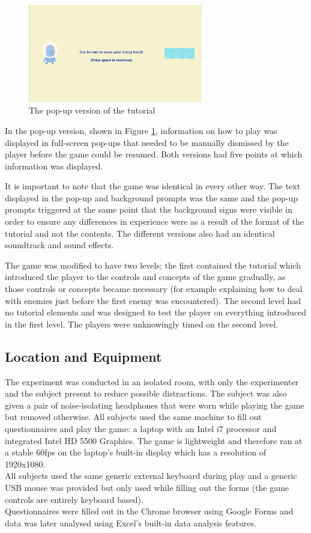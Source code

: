 \documentclass{acmsiggraph}
\begin{document}
\begin{figure}[!h]
  \centering
  \includegraphics[width=3.0in]{images/odd}
  \caption{The pop-up version of the tutorial}
  \label{fig:odd}
\end{figure}
In the pop-up version, shown in Figure \ref{fig:odd}, information on how to play was displayed in full-screen pop-ups that needed to be manually dismissed by the player before the game could be resumed. Both versions had five points at which information was displayed. 

It is important to note that the game was identical in every other way. The text displayed in the pop-up and background prompts was the same and the pop-up prompts triggered at the same point that the background signs were visible in order to ensure any differences in experience were as a result of the format of the tutorial and not the contents. The different versions also had an identical soundtrack and sound effects.

The game was modified to have two levels; the first contained the tutorial which introduced the player to the controls and concepts of the game gradually, as those controls or concepts became necessary (for example explaining how to deal with enemies just before the first enemy was encountered). The second level had no tutorial elements and was designed to test the player on everything introduced in the first level. The players were unknowingly timed on the second level.


\subsection{Location and Equipment}
The experiment was conducted in an isolated room, with only the experimenter and the subject present to reduce possible distractions.
The subject was also given a pair of noise-isolating headphones that were worn while playing the game but removed otherwise.
All subjects used the same machine to fill out questionnaires and play the game: a laptop with an Intel i7 processor and integrated Intel HD 5500 Graphics. The game is lightweight and therefore ran at a stable 60fps on the laptop's built-in display which has a resolution of 1920x1080.\\
All subjects used the same generic external keyboard during play and a generic USB mouse was provided but only used while filling out the forms (the game controls are entirely keyboard based). \\
Questionnaires were filled out in the Chrome browser using Google Forms and data was later analysed using Excel's built-in data analysis features.
\end{document}

